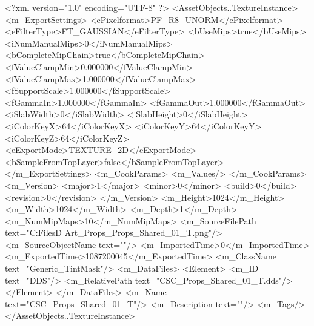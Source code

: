 <?xml version="1.0" encoding="UTF-8" ?>
<AssetObjects..TextureInstance>
	<m_ExportSettings>
		<ePixelformat>PF_R8_UNORM</ePixelformat>
		<eFilterType>FT_GAUSSIAN</eFilterType>
		<bUseMips>true</bUseMips>
		<iNumManualMips>0</iNumManualMips>
		<bCompleteMipChain>true</bCompleteMipChain>
		<fValueClampMin>0.000000</fValueClampMin>
		<fValueClampMax>1.000000</fValueClampMax>
		<fSupportScale>1.000000</fSupportScale>
		<fGammaIn>1.000000</fGammaIn>
		<fGammaOut>1.000000</fGammaOut>
		<iSlabWidth>0</iSlabWidth>
		<iSlabHeight>0</iSlabHeight>
		<iColorKeyX>64</iColorKeyX>
		<iColorKeyY>64</iColorKeyY>
		<iColorKeyZ>64</iColorKeyZ>
		<eExportMode>TEXTURE_2D</eExportMode>
		<bSampleFromTopLayer>false</bSampleFromTopLayer>
	</m_ExportSettings>
	<m_CookParams>
		<m_Values/>
	</m_CookParams>
	<m_Version>
		<major>1</major>
		<minor>0</minor>
		<build>0</build>
		<revision>0</revision>
	</m_Version>
	<m_Height>1024</m_Height>
	<m_Width>1024</m_Width>
	<m_Depth>1</m_Depth>
	<m_NumMipMaps>10</m_NumMipMaps>
	<m_SourceFilePath text="C:\Users\Shadow\Desktop\Working Files\3D Art\Textures\CSC_Props\Current\textures\CSC_Props_Shared_01_T.png"/>
	<m_SourceObjectName text=""/>
	<m_ImportedTime>0</m_ImportedTime>
	<m_ExportedTime>1087200045</m_ExportedTime>
	<m_ClassName text="Generic_TintMask"/>
	<m_DataFiles>
		<Element>
			<m_ID text="DDS"/>
			<m_RelativePath text="CSC_Props_Shared_01_T.dds"/>
		</Element>
	</m_DataFiles>
	<m_Name text="CSC_Props_Shared_01_T"/>
	<m_Description text=""/>
	<m_Tags/>
</AssetObjects..TextureInstance>
